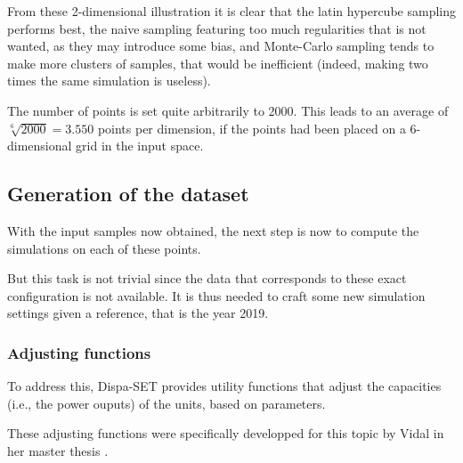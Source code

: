 From these 2-dimensional illustration it is clear that the latin hypercube sampling performs best, the naive sampling featuring too much regularities that is not wanted, as they may introduce some bias, and Monte-Carlo sampling tends to make more clusters of samples, that would be inefficient (indeed, making two times the same simulation is useless).

The number of points is set quite arbitrarily to 2000. This leads to an average of $\sqrt[6]{2000} = 3.550$ points per dimension, if the points had been placed on a 6-dimensional grid in the input space. 

\subsection{Generation of the dataset}

With the input samples now obtained, the next step is now to compute the simulations on each of these points.

But this task is not trivial since the data that corresponds to these exact configuration is not available. It is thus needed to craft some new simulation settings given a reference, that is the year 2019.

\subsubsection{Adjusting functions}
To address this, Dispa-SET provides utility functions that adjust the capacities (i.e., the power ouputs) of the units, based on parameters.

These adjusting functions were specifically developped for this topic by Vidal in her master thesis \cite{carlas-thesis}.

